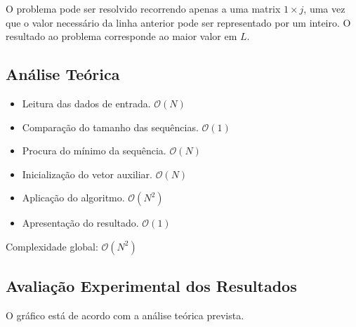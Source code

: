 \documentclass[12pt, letterpaper]{article}
\begin{document}
O problema pode ser resolvido recorrendo apenas a uma matrix $1 \times j$, uma
vez que o valor necessário da linha anterior pode ser representado por um
inteiro. O resultado ao problema corresponde ao maior valor em $L$.


\subsection{Análise Teórica}

\begin{itemize}
	\item Leitura das dados de entrada. $\mathcal{O}(N)$
	\item Comparação do tamanho das sequências. $\mathcal{O}(1)$
	\item Procura do mínimo da sequência. $\mathcal{O}(N)$
	\item Inicialização do vetor auxiliar. $\mathcal{O}(N)$
	\item Aplicação do algoritmo. $\mathcal{O}(N^2)$
	\item Apresentação do resultado. $\mathcal{O}(1)$
\end{itemize}
Complexidade global: $\mathcal{O}(N^2)$

\subsection{Avaliação Experimental dos Resultados}

\begin{figure}[H]
	\centering

\end{figure}

O gráfico está de acordo com a análise teórica prevista.
\end{document}
